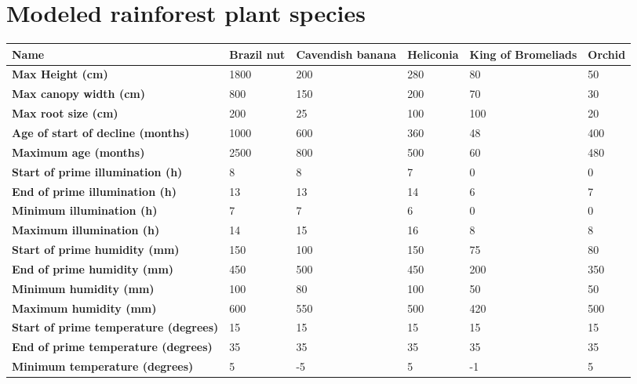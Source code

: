 \chapter{Modeled rainforest plant species} \label{AppendixE}

\begin{longtable}{|p{4cm}|p{2cm}|p{2cm}|p{2cm}|p{2cm}|p{2cm}|}
		\hline		
		\textbf{Name} & \textbf{Brazil nut} & \textbf{Cavendish banana} & \textbf{Heliconia} & \textbf{King of Bromeliads} & \textbf{Orchid}\\
		\hline
		\textbf{Max Height (cm)} & 
		1800 & 
		200 & 
		280 & 
		80 & 
		50\\
		\hline
		\textbf{Max canopy width (cm)} & 
		800 & 
		150 & 
		200 & 
		70 & 
		30 \\
		\hline
		\textbf{Max root size (cm)} & 
		200 & 
		25 & 
		100 & 
		100 & 
		20 \\
		\hline
		\textbf{Age of start of decline (months)} & 
		1000 & 
		600 & 
		360 & 
		48 & 
		400 \\
		\hline
		\textbf{Maximum age (months)} & 
		2500 & 
		800 & 
		500 & 
		60 & 
		480 \\
		\hline
		\textbf{Start of prime illumination (h)} &
		8 & 
		8 & 
		7 & 
		0 & 
		0 \\
		\hline
		\textbf{End of prime illumination (h)} & 
		13 & 
		13 & 
		14 & 
		6 & 
		7 \\
		\hline
		\textbf{Minimum illumination (h)} & 
		7 & 
		7 & 
		6 & 
		0 & 
		0 \\
		\hline
		\textbf{Maximum illumination (h)} & 
		14 & 
		15 & 
		16 & 
		8 & 
		8 \\
		\hline
		\textbf{Start of prime humidity (mm)} & 
		150 & 
		100 & 
		150 & 
		75 & 
		80 \\
		\hline
		\textbf{End of prime humidity (mm)} & 
		450 & 
		500 & 
		450 & 
		200 & 
		350 \\
		\hline
		\textbf{Minimum humidity (mm)} &
		100 & 
		80 & 
		100 & 
		50 & 
		50 \\
		\hline
		\textbf{Maximum humidity (mm)} & 
		600 & 
		550 & 
		500 & 
		420 & 
		500 \\
		\hline
		\textbf{Start of prime temperature (degrees)} & 
		15 & 
		15 & 
		15 & 
		15 & 
		15 \\
		\hline
		\textbf{End of prime temperature (degrees)} & 
		35 & 
		35 & 
		35 & 
		35 & 
		35 \\
		\hline
		\textbf{Minimum temperature (degrees)} & 
		5 & 
		-5 & 
		5 & 
		-1 & 
		5 \\

\end{longtable}
